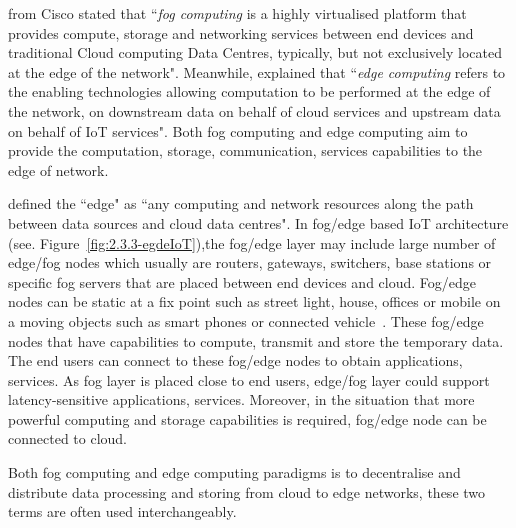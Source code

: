 \cite{Bonomi:2012} from Cisco stated that ``\textit{fog computing} is a highly virtualised platform that provides compute, storage and networking services between end devices and traditional Cloud computing Data Centres, typically, but not exclusively located at the edge of the network".
Meanwhile, \cite{WShi:2016} explained that ``\textit{edge computing} refers to the enabling technologies allowing computation to be performed at the edge of the network, on downstream data on behalf of cloud services and upstream data on behalf of IoT services".
Both fog computing and edge computing aim to provide the computation, storage, communication, services capabilities to the edge of network.

\cite{WShi:2016} defined the ``edge" as ``any computing and network resources along the path between data sources and cloud data centres".
In fog/edge based IoT architecture (see. Figure~\ref{fig:2.3.3-egdeIoT}),the fog/edge layer may include large number of edge/fog nodes which usually are routers, gateways, switchers, base stations or specific fog servers that are placed between end devices and cloud. 
Fog/edge nodes can be static at a fix point such as street light, house, offices or mobile on a moving objects such as smart phones or connected vehicle~\citep{Bonomi:2014}. 
These fog/edge nodes that have capabilities to compute, transmit and store the temporary data.
The end users can connect to these fog/edge nodes to obtain applications, services.
As fog layer is placed close to end users, edge/fog layer could support latency-sensitive applications, services.
Moreover, in the situation that more powerful computing and storage capabilities is required, fog/edge node can be connected to cloud. 



Both fog computing and edge computing paradigms is to decentralise and distribute data processing and storing from cloud to edge networks, these two terms are often used interchangeably.




